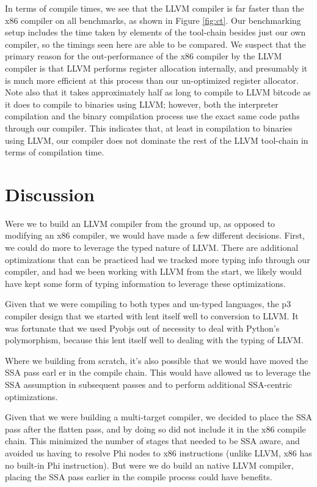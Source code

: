 \documentclass[11pt,twocolumn]{article}
\begin{document}
In terms of compile times, we see that the LLVM compiler is far faster
than the x86 compiler on all benchmarks, as shown in Figure
\ref{fig:ct}. Our benchmarking setup includes the time taken by
elements of the tool-chain besides just our own compiler, so the
timings seen here are able to be compared. We suspect that the primary
reason for the out-performance of the x86 compiler by the LLVM compiler
is that LLVM performs register allocation internally, and presumably
it is much more efficient at this process than our un-optimized
register allocator. Note also that it takes approximately half as long
to compile to LLVM bitcode as it does to compile to binaries using
LLVM; however, both the interpreter compilation and the binary
compilation process use the exact same code paths through our
compiler. This indicates that, at least in compilation to binaries
using LLVM, our compiler does not dominate the rest of the LLVM
tool-chain in terms of compilation time.

\section{Discussion}

Were we to build an LLVM compiler from the ground up, as opposed to
modifying an x86 compiler, we would have made a few different
decisions. First, we could do more to leverage the typed nature of
LLVM. There are additional optimizations that can be practiced had we
tracked more typing info through our compiler, and had we been working
with LLVM from the start, we likely would have kept some form of typing
information to leverage these optimizations.

Given that we were compiling to both types and un-typed languages, the
p3 compiler design that we started with lent itself well to conversion
to LLVM. It was fortunate that we used Pyobjs out of necessity to deal
with Python's polymorphism, because this lent itself well to dealing
with the typing of LLVM.

Where we building from scratch, it's also possible that we would have
moved the SSA pass earl er in the compile chain. This would have
allowed us to leverage the SSA assumption in subsequent passes and to
perform additional SSA-centric optimizations.

Given that we were building a multi-target compiler, we decided to
place the SSA pass after the flatten pass, and by doing so did not
include it in the x86 compile chain. This minimized the number of
stages that needed to be SSA aware, and avoided us having to resolve
Phi nodes to x86 instructions (unlike LLVM, x86 has no built-in Phi
instruction). But were we do build an native LLVM compiler, placing
the SSA pass earlier in the compile process could have benefits.
\end{document}

